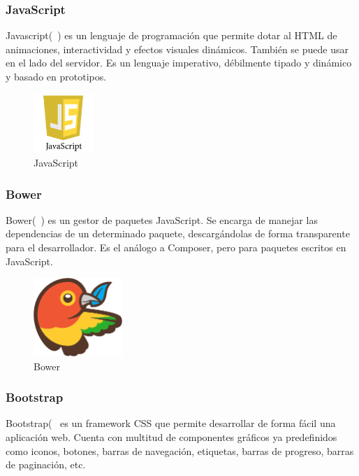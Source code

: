 \subsubsection*{JavaScript}
Javascript(~\cite{javascript}) es un lenguaje de programación que permite dotar al HTML de animaciones, interactividad y efectos visuales dinámicos. También se puede usar en el lado del servidor. Es un lenguaje imperativo, débilmente tipado y dinámico y basado en prototipos.

\begin{figure}[tbh]
\centering
\label{fig:javascript}
\includegraphics[width=0.2\textwidth]{imagenes/javascript}
\caption{JavaScript}
\end{figure}

\subsubsection*{Bower}
Bower(~\cite{bower}) es un gestor de paquetes JavaScript. Se encarga de manejar las dependencias de un determinado paquete, descargándolas de forma transparente para el desarrollador. Es el análogo a Composer, pero para paquetes escritos en JavaScript.

\begin{figure}[tbh]
\centering
\label{fig:bower}
\includegraphics[width=0.3\textwidth]{imagenes/bower}
\caption{Bower}
\end{figure}

\subsubsection*{Bootstrap}
Bootstrap(~\cite{bootstrap)} es un framework CSS que permite desarrollar de forma fácil una aplicación web. Cuenta con multitud de componentes gráficos ya predefinidos como iconos, botones, barras de navegación, etiquetas, barras de progreso, barras de paginación, etc.

